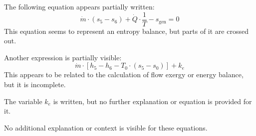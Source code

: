 The following equation appears partially written:  
\[
\dot{m} \cdot (s_5 - s_6) + \dot{Q} \cdot \frac{1}{T} - s_{\text{gen}} = 0
\]  
This equation seems to represent an entropy balance, but parts of it are crossed out.  

Another expression is partially visible:  
\[
\dot{m} \cdot [h_5 - h_6 - T_0 \cdot (s_5 - s_0)] + k_e
\]  
This appears to be related to the calculation of flow exergy or energy balance, but it is incomplete.  

The variable \( k_e \) is written, but no further explanation or equation is provided for it.  

No additional explanation or context is visible for these equations.